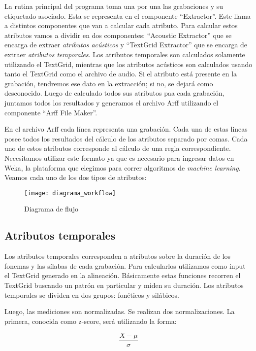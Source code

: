 La rutina principal del programa toma una por una las grabaciones y su etiquetado asociado. Esta se representa en el componente ``Extractor''. Este llama a distintos componentes que van a calcular cada atributo. Para calcular estos atributos vamos a dividir en dos componentes: ``Acoustic Extractor'' que se encarga de extraer \textit{atributos acústicos} y ``TextGrid Extractor'' que se encarga de extraer \textit{atributos temporales}. Los atributos temporales son calculados solamente utilizando el TextGrid, mientras que los atributos acústicos son calculados usando tanto el TextGrid como el archivo de audio. Si el atributo está presente en la grabación, tendremos ese dato en la extracción; si no, se dejará como desconocido. Luego de calculado todos sus atributos paa cada grabación, juntamos todos los resultados y generamos el archivo Arff utilizando el componente ``Arff File Maker''.

En el archivo Arff cada línea representa una grabación.  Cada una de estas lineas posee todos los resultados del cálculo de los atributos separado por comas. Cada uno de estos atributos corresponde al cálculo de una regla correspondiente. Necesitamos utilizar este formato ya que es necesario para ingresar datos en Weka, la plataforma que elegimos para correr algoritmos de \textit{machine learning}. Veamos cada uno de los dos tipos de atributos:

\begin{figure}[h!]
    \centerline{\texttt{[image: diagrama\_workflow]} }
    \caption{Diagrama de flujo}
    \label{workflow}
\end{figure}

\subsection{Atributos temporales}

Los atributos temporales corresponden a atributos sobre la duración de los fonemas y las sílabas de cada grabación. Para calcularlos utilizamos como input el TextGrid generado en la alineación. Básicamente estas funciones recorren el TextGrid buscando un patrón en particular y miden su duración. Los atributos temporales se dividen en dos grupos: fonéticos y silábicos. 

Luego, las mediciones son normalizadas. Se realizan dos normalizaciones. La primera, conocida como z-score, será utilizando la forma:

\hspace{2cm} \[\frac{ X - \mu }{ \sigma }\]

